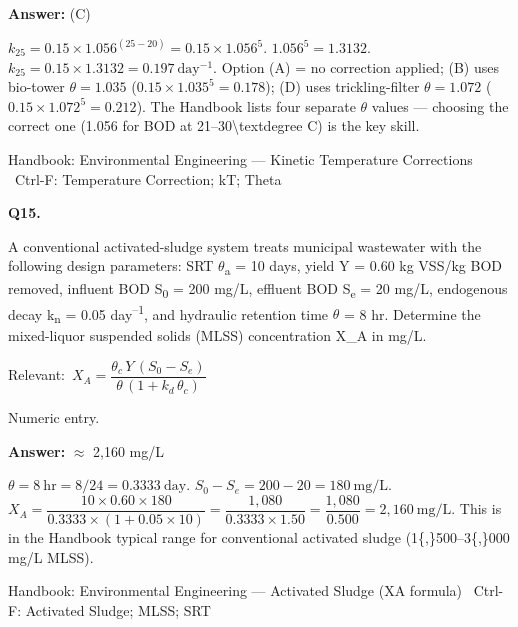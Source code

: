 \documentclass[11pt]{article}
\begin{document}
\vspace{2pt}\par\noindent\colorbox{boxbg}{\parbox{\dimexpr\linewidth-2\fboxsep\relax}{%
\vspace{2pt}\textbf{Answer:} (C)\par\vspace{2pt}
{\small $k_{25} = 0.15\times 1.056^{(25-20)} = 0.15\times 1.056^5$.  $1.056^5 = 1.3132$.  $k_{25} = 0.15\times1.3132 = 0.197\ \mathrm{day^{-1}}$. Option (A) = no correction applied; (B) uses bio-tower $\theta = 1.035$ ($0.15\times1.035^5 = 0.178$); (D) uses trickling-filter $\theta = 1.072$ ($0.15\times1.072^5 = 0.212$). The Handbook lists four separate $\theta$ values --- choosing the correct one (1.056 for BOD at 21--30\textbackslash{}textdegree C) is the key skill.}\par\vspace{2pt}
{\footnotesize\color{soft}Handbook: Environmental Engineering --- Kinetic Temperature Corrections \textbullet\ Ctrl-F: Temperature Correction; kT; Theta}\vspace{2pt}
}}
\vspace{9pt}
\filbreak
\textbf{\color{accent}Q15.}\par\vspace{2pt}
A conventional activated-sludge system treats municipal wastewater with the following design parameters: SRT $\theta$\textsubscript{a} = 10 days, yield Y = 0.60 kg VSS/kg BOD removed, influent BOD S\textsubscript{0} = 200 mg/L, effluent BOD S\textsubscript{e} = 20 mg/L, endogenous decay k\textsubscript{n} = 0.05 day\textsuperscript{--}\textsuperscript{1}, and hydraulic retention time $\theta$ = 8 hr. Determine the mixed-liquor suspended solids (MLSS) concentration X\_A in mg/L.\par\vspace{3pt}
{\small\color{soft}Relevant:}\ $X_A = \dfrac{\theta_c\,Y\,(S_0 - S_e)}{\theta\,(1 + k_d\,\theta_c)}$\par\vspace{3pt}
{\small\color{soft}Numeric entry.}\par\vspace{3pt}
\vspace{2pt}\par\noindent\colorbox{boxbg}{\parbox{\dimexpr\linewidth-2\fboxsep\relax}{%
\vspace{2pt}\textbf{Answer:} $\approx$ 2,160 mg/L\par\vspace{2pt}
{\small $\theta = 8\ \mathrm{hr} = 8/24 = 0.3333\ \mathrm{day}$.  $S_0-S_e = 200-20 = 180\ \mathrm{mg/L}$.  $X_A = \dfrac{10\times0.60\times180}{0.3333\times(1+0.05\times10)} = \dfrac{1{,}080}{0.3333\times1.50} = \dfrac{1{,}080}{0.500} = 2{,}160\ \mathrm{mg/L}$. This is in the Handbook typical range for conventional activated sludge (1\{,\}500--3\{,\}000 mg/L MLSS).}\par\vspace{2pt}
{\footnotesize\color{soft}Handbook: Environmental Engineering --- Activated Sludge (XA formula) \textbullet\ Ctrl-F: Activated Sludge; MLSS; SRT}\vspace{2pt}
}}
\end{document}
